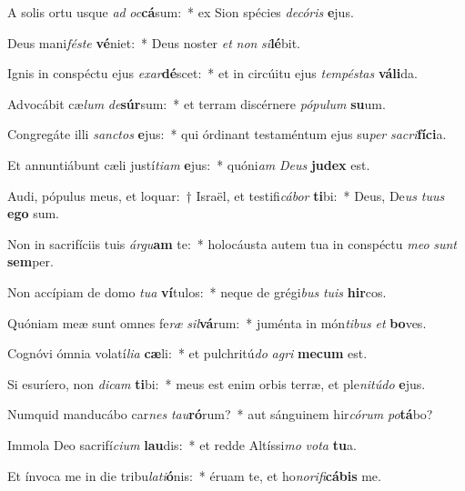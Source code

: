 \item A solis ortu usque \textit{ad} \textit{oc}\textbf{cá}sum:~* ex Sion spécies \textit{de}\textit{có}\textit{ris} \textbf{e}jus.
\item Deus mani\textit{fés}\textit{te} \textbf{vé}niet:~* Deus noster \textit{et} \textit{non} \textit{si}\textbf{lé}bit.
\item Ignis in conspéctu ejus \textit{ex}\textit{ar}\textbf{dé}scet:~* et in circúitu ejus \textit{tem}\textit{pés}\textit{tas} \textbf{vá}\textbf{li}da.
\item Advocábit cæ\textit{lum} \textit{de}\textbf{súr}sum:~* et terram discérnere \textit{pó}\textit{pu}\textit{lum} \textbf{su}um.
\item Congregáte illi \textit{sanc}\textit{tos} \textbf{e}jus:~* qui órdinant testaméntum ejus su\textit{per} \textit{sa}\textit{cri}\textbf{fí}\textbf{ci}a.
\item Et annuntiábunt cæli justí\textit{ti}\textit{am} \textbf{e}jus:~* quóni\textit{am} \textit{De}\textit{us} \textbf{ju}\textbf{dex} est.
\item Audi, pópulus meus, et loquar:~† Israël, et testifi\textit{cá}\textit{bor} \textbf{ti}bi:~* Deus, De\textit{us} \textit{tu}\textit{us} \textbf{e}\textbf{go} sum.
\item Non in sacrifíciis tuis \textit{ár}\textit{gu}\textbf{am} te:~* holocáusta autem tua in conspéctu \textit{me}\textit{o} \textit{sunt} \textbf{sem}per.
\item Non accípiam de domo \textit{tu}\textit{a} \textbf{ví}tulos:~* neque de grégi\textit{bus} \textit{tu}\textit{is} \textbf{hir}cos.
\item Quóniam meæ sunt omnes fe\textit{ræ} \textit{sil}\textbf{vá}rum:~* juménta in món\textit{ti}\textit{bus} \textit{et} \textbf{bo}ves.
\item Cognóvi ómnia volatí\textit{li}\textit{a} \textbf{cæ}li:~* et pulchritú\textit{do} \textit{a}\textit{gri} \textbf{me}\textbf{cum} est.
\item Si esuríero, non \textit{di}\textit{cam} \textbf{ti}bi:~* meus est enim orbis terræ, et ple\textit{ni}\textit{tú}\textit{do} \textbf{e}jus.
\item Numquid manducábo car\textit{nes} \textit{tau}\textbf{ró}rum?~* aut sánguinem hir\textit{có}\textit{rum} \textit{po}\textbf{tá}bo?
\item Immola Deo sacrifí\textit{ci}\textit{um} \textbf{lau}dis:~* et redde Altíssi\textit{mo} \textit{vo}\textit{ta} \textbf{tu}a.
\item Et ínvoca me in die tribu\textit{la}\textit{ti}\textbf{ó}nis:~* éruam te, et ho\textit{no}\textit{ri}\textit{fi}\textbf{cá}\textbf{bis} me.

